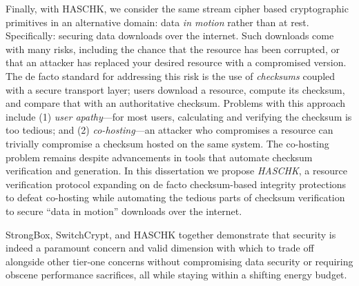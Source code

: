 Finally, with HASCHK, we consider the same stream cipher based cryptographic
primitives in an alternative domain: data \emph{in motion} rather than at rest.
Specifically: securing data downloads over the internet. Such downloads come
with many risks, including the chance that the resource has been corrupted, or
that an attacker has replaced your desired resource with a compromised version.
The de facto standard for addressing this risk is the use of \emph{checksums}
coupled with a secure transport layer; users download a resource, compute its
checksum, and compare that with an authoritative checksum. Problems with this
approach include (1) \emph{user apathy}---for most users, calculating and
verifying the checksum is too tedious; and (2) \emph{co-hosting}---an attacker
who compromises a resource can trivially compromise a checksum hosted on the
same system. The co-hosting problem remains despite advancements in tools that
automate checksum verification and generation. In this dissertation we propose
\emph{HASCHK}, a resource verification protocol expanding on de facto
checksum-based integrity protections to defeat co-hosting while automating the
tedious parts of checksum verification to secure ``data in motion'' downloads
over the internet.

StrongBox, SwitchCrypt, and HASCHK together demonstrate that security is indeed
a paramount concern and valid dimension with which to trade off alongside other
tier-one concerns without compromising data security or requiring obscene
performance sacrifices, all while staying within a shifting energy budget.
